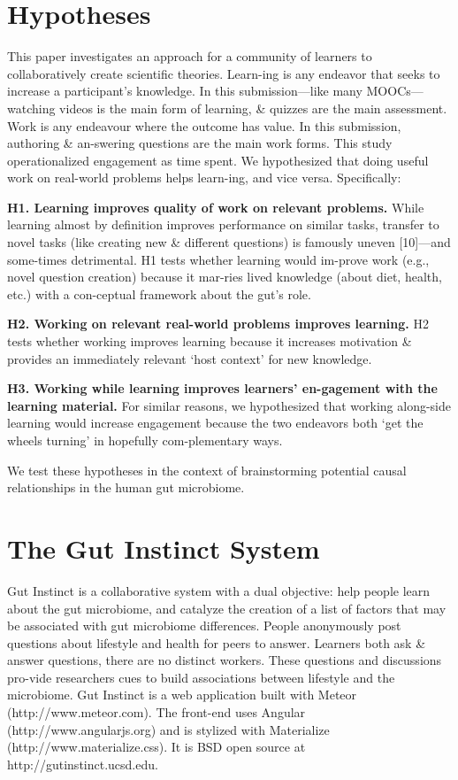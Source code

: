 \section{Hypotheses}
This paper investigates an approach for a community of learners to collaboratively create scientific theories. Learn-ing is any endeavor that seeks to increase a participant’s knowledge. In this submission—like many MOOCs—watching videos is the main form of learning, \& quizzes are the main assessment. Work is any endeavour where the outcome has value. In this submission, authoring \& an-swering questions are the main work forms. This study operationalized engagement as time spent. We hypothesized that doing useful work on real-world problems helps learn-ing, and vice versa. Specifically:

\textbf{H1. Learning improves quality of work on relevant problems.}
While learning almost by definition improves performance on similar tasks, transfer to novel tasks (like creating new \& different questions) is famously uneven [10]—and some-times detrimental. H1 tests whether learning would im-prove work (e.g., novel question creation) because it mar-ries lived knowledge (about diet, health, etc.) with a con-ceptual framework about the gut’s role.

\textbf{H2. Working on relevant real-world problems improves learning.}
H2 tests whether working improves learning because it increases motivation \& provides an immediately relevant ‘host context’ for new knowledge.
 
\textbf{H3. Working while learning improves learners’ en-gagement with the learning material.} 
For similar reasons, we hypothesized that working along-side learning would increase engagement because the two endeavors both ‘get the wheels turning’ in hopefully com-plementary ways.

We test these hypotheses in the context of brainstorming potential causal relationships in the human gut microbiome. 

\section{The Gut Instinct System}
Gut Instinct is a collaborative system with a dual objective: help people learn about the gut microbiome, and catalyze the creation of a list of factors that may be associated with gut microbiome differences. People anonymously post questions about lifestyle and health for peers to answer. Learners both ask \& answer questions, there are
no distinct workers. These questions and discussions pro-vide researchers cues to build associations between lifestyle and the microbiome.
Gut Instinct is a web application built with Meteor (http://www.meteor.com). The front-end uses Angular (http://www.angularjs.org) and is stylized with Materialize (http://www.materialize.css). It is BSD open source at http://gutinstinct.ucsd.edu.

